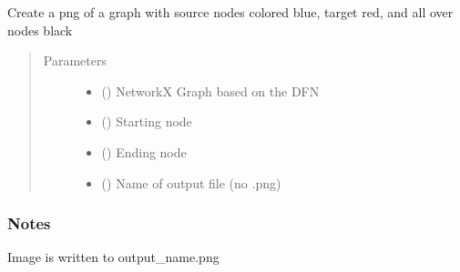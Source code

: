 \documentclass[letterpaper,10pt,english]{sphinxmanual}
\begin{document}
\begin{fulllineitems}
\label{\detokenize{pydfnworks:pydfnworks.dfnGraph.dfn2graph.plot_graph}}
Create a png of a graph with source nodes colored blue, target red, and all over nodes black
\begin{quote}\begin{description}
\item[{Parameters}] \leavevmode\begin{itemize}
\item {} 
 () \textendash{} NetworkX Graph based on the DFN

\item {} 
 () \textendash{} Starting node

\item {} 
 () \textendash{} Ending node

\item {} 
 () \textendash{} Name of output file (no .png)

\end{itemize}

\end{description}\end{quote}
\subsubsection*{Notes}

Image is written to output\_name.png

\end{fulllineitems}

\end{document}
